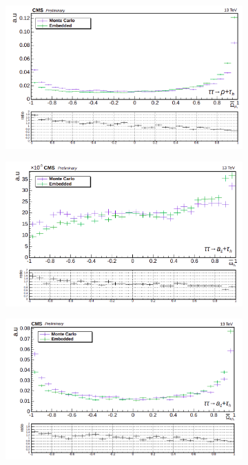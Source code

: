 \begin{figure}
\begin{subfigure}[b]{0.5\linewidth}
    \caption*{} 
    \vspace{10mm}
  \end{subfigure}%
  \begin{subfigure}[b]{0.5\linewidth}
    \centering
    \includegraphics[width=\linewidth]{Chapitre6/Images/OptVar/Omegabar_rhotauh.png} 
    \caption*{} 
    \vspace{10mm}
  \end{subfigure}
      \begin{subfigure}[b]{0.5\linewidth}
    \centering
    \includegraphics[width=\linewidth]{Chapitre6/Images/OptVar/omegabar_a1_a1tauh.png} 
    \caption*{} 
    \vspace{0.5ex}
  \end{subfigure}%
  \begin{subfigure}[b]{0.5\linewidth}
    \centering
    \includegraphics[width=\linewidth]{Chapitre6/Images/OptVar/Omegabar_a1tauh.png} 

\end{subfigure}
\end{figure}
